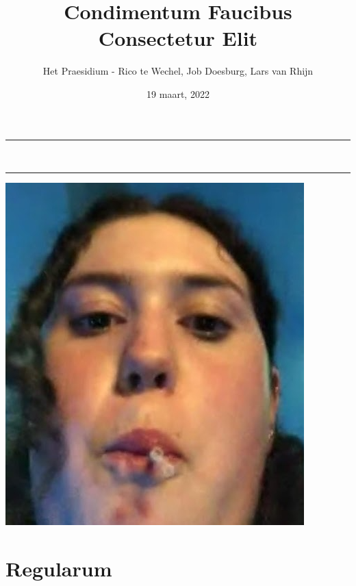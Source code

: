 \documentclass[10pt]{article}
\title{Condimentum Faucibus Consectetur Elit}
\date{{19 maart, 2022}}
\author{Het Praesidium - Rico te Wechel, Job Doesburg, Lars van Rhijn} %
\begin{document}
\begin{titlepage}
\centering
\vspace*{0.5cm}
\hrule
\vspace{0.4cm}
{\LARGE \textsc{\thetitle}}\\[0.4cm]
\vspace{0.4cm}
\hrule
\vspace{15mm}

\includegraphics[scale=0.5]{front.png}  %

\vfill
\vspace{1.5cm}
{\Large \thedate}
\vspace{2cm}
\end{titlepage}
\thispagestyle{empty}

\newpage
\vspace{1cm}
\setcounter{secnumdepth}{-1}
\tableofcontents
\renewcommand{\baselinestretch}{1.0}\normalsize
\newpage

\section{Regularum}
\footnotesize

\vspace{1cm}
\end{document}

